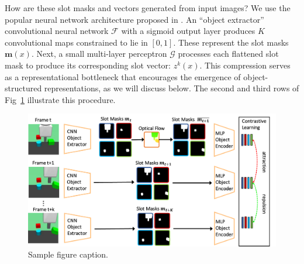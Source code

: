\documentclass{article}
\begin{document}
How are these slot masks and vectors generated from input images? We use the popular neural network architecture proposed in \citet{kipf2019contrastive}. An ``object extractor'' convolutional neural network $\mathcal{F}$ with a sigmoid output layer produces $K$ convolutional maps constrained to lie in $[0, 1]$. These represent the slot masks $ \bm{m}(x)$. Next, a small multi-layer perceptron $\mathcal{G}$ processes each flattened slot mask to produce its corresponding slot vector: $z^k(x)$. This compression serves as a representational bottleneck that encourages the emergence of object-structured representations, as we will discuss below. The second and third rows of Fig~\ref{fig:architecture} illustrate this procedure.

 






\begin{figure}
  \centering
  \includegraphics[width=14cm]{figs/flood-network.pdf}

  \caption{Sample figure caption.}
  \label{fig:architecture}
\end{figure}
\end{document}
